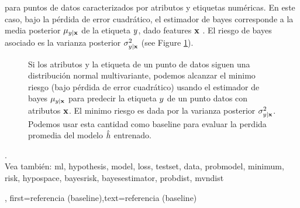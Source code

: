 {{para puntos de datos caracterizados por atributos y etiquetas numéricas.
En este caso, bajo la pérdida de error cuadrático, el estimador de bayes corresponde a la media posterior
$\mu_{y|{\bf x}}$ de la etiqueta $y$, dado  
\gls{feature}s ${\bf x}$ \cite{LC,GrayProbBook}. El riesgo de bayes asociado es la 
varianza posterior
$\sigma^{2}_{y|{\bf x}}$ (see Figure \ref{fig_post_baseline_dict}).
	\begin{figure}[H]
		\begin{center}
		\end{center}
		\caption{Si los atributos y la etiqueta de un punto de datos siguen una distribución normal multivariante,  
		podemos alcanzar el minimo riesgo (bajo pérdida de error cuadrático) usando el estimador de bayes $\mu_{y|{\bf x}}$ 
		para predecir la etiqueta $y$ de un punto datos con atributos ${\bf x}$. El
		minimo riesgo es dada por la varianza posterior $\sigma^{2}_{y|{\bf x}}$. Podemos 
		usar esta cantidad como baseline para evaluar la perdida promedia del modelo $\hat{h}$ entrenado. \label{fig_post_baseline_dict}}
	\end{figure}.
	\\
		Vea también: \gls{ml},  \gls{hypothesis}, \gls{model}, \gls{loss}, \gls{testset}, \gls{data}, \gls{probmodel}, \gls{minimum},  \gls{risk}, \gls{hypospace}, \gls{bayesrisk}, \gls{bayesestimator}, \gls{probdist}, \gls{mvndist}   },
    first={referencia (baseline)},text={referencia (baseline)}
}

